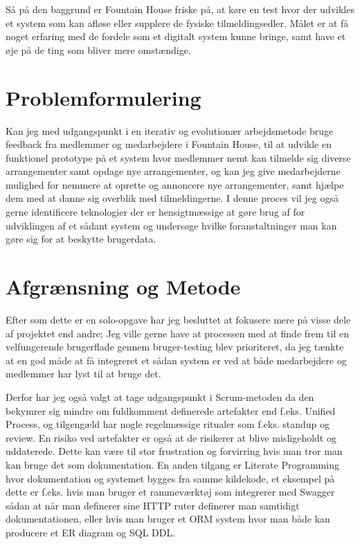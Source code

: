 \documentclass[../main]{subfiles}
\begin{document}
    Så på den baggrund er Fountain House friske på, at køre en test hvor der udvikles et system som kan afløse eller supplere de fysiske tilmeldingsedler.
    \enskip
    Målet er at få noget erfaring med de fordele som et digitalt system kunne bringe, samt have et øje på de ting som bliver mere omstændige.


\section{Problemformulering}
    Kan jeg med udgangspunkt i en iterativ og evolutionær arbejdsmetode bruge feedback fra medlemmer og medarbejdere i Fountain House, til at udvikle en funktionel prototype på et system hvor medlemmer nemt kan tilmelde sig diverse arrangementer samt opdage nye arrangementer, og kan jeg give medarbejderne mulighed for nemmere at oprette og annoncere nye arrangementer, samt hjælpe dem med at danne sig overblik med tilmeldingerne.
    \enskip
    I denne proces vil jeg også gerne identificere teknologier der er hensigtmæssige at gøre brug af for udviklingen af et sådant system og undersøge hvilke foranstaltninger man kan gøre sig for at beskytte brugerdata.


\section{Afgrænsning og Metode}
    Efter som dette er en solo-opgave har jeg besluttet at fokusere mere på visse dele af projektet end  andre;
    \enskip
    Jeg ville gerne have at processen med at finde frem til en velfungerende brugerflade gennem bruger-testing blev prioriteret, da jeg tænkte at en god måde at få integreret et sådan system er ved at både medarbejdere og medlemmer har lyst til at bruge det.
    \enskip
    
    Derfor har jeg også valgt at tage udgangspunkt i Scrum-metoden da den bekymrer sig mindre om fuldkomment definerede artefakter end f.eks. Unified Process, og tilgengæld har nogle regelmæssige ritualer som f.eks. standup og review.
    \enskip
    En risiko ved artefakter er også at de risikerer at blive misligeholdt og uddaterede. Dette kan være til stor frustration og forvirring hvis man tror man kan bruge det som dokumentation. En anden tilgang er Literate Programming hvor dokumentation og systemet bygges fra samme kildekode, et eksempel på dette er f.eks. hvis man bruger et rammeværktøj som integrerer med Swagger sådan at når man definerer sine HTTP ruter definerer man samtidigt dokumentationen, eller hvis man bruger et ORM system hvor man både kan producere et ER diagram og SQL DDL.
\end{document}
